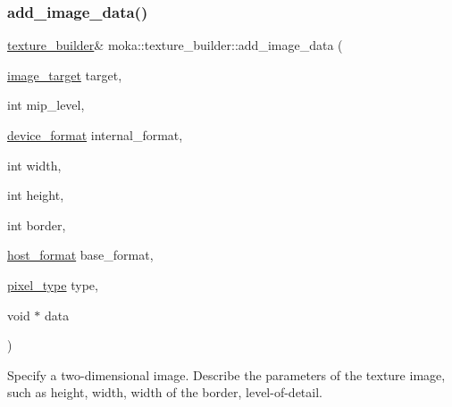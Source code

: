\subsubsection{\texorpdfstring{add\_image\_data()}{add\_image\_data()}\hspace{0.1cm}{\footnotesize\ttfamily [2/2]}}
{\footnotesize\ttfamily \mbox{\hyperlink{classmoka_1_1texture__builder}{texture\+\_\+builder}}\& moka\+::texture\+\_\+builder\+::add\+\_\+image\+\_\+data (\begin{DoxyParamCaption}\item[{\mbox{\hyperlink{namespacemoka_a6f402ae62a72ce17ff73fa94d526800e}{image\+\_\+target}}}]{target,  }\item[{int}]{mip\+\_\+level,  }\item[{\mbox{\hyperlink{namespacemoka_ac2d188857be60286ff735744a33ebd2d}{device\+\_\+format}}}]{internal\+\_\+format,  }\item[{int}]{width,  }\item[{int}]{height,  }\item[{int}]{border,  }\item[{\mbox{\hyperlink{namespacemoka_a1989c05aecf3bb10bbf8a7027e3df130}{host\+\_\+format}}}]{base\+\_\+format,  }\item[{\mbox{\hyperlink{namespacemoka_a067d388d48715c4e725cd426d5bf3770}{pixel\+\_\+type}}}]{type,  }\item[{void $\ast$}]{data }\end{DoxyParamCaption})}



Specify a two-\/dimensional image. Describe the parameters of the texture image, such as height, width, width of the border, level-\/of-\/detail. 


